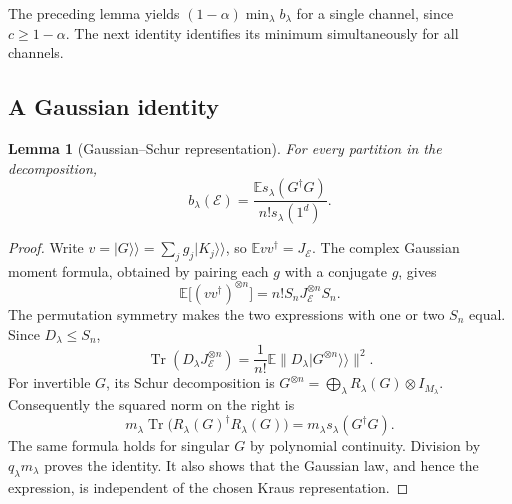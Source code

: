 \documentclass[11pt,a4paper]{article}
\newtheorem{lemma}[theorem]{Lemma}
\theoremstyle{remark}\newtheorem{remark}[theorem]{Remark}
\DeclareMathOperator{\Tr}{Tr}
\newcommand{\E}{\mathcal E}
\newcommand{\EE}{\mathbb E}
\newcommand{\vket}[1]{\lvert #1\rangle\!\rangle}
\begin{document}
The preceding lemma yields $(1-\alpha)\min_\lambda b_\lambda$ for a single channel, since $c\ge1-\alpha$. The next identity identifies its minimum simultaneously for all channels.

\subsection{A Gaussian identity}
\begin{lemma}[Gaussian--Schur representation]\label{lem:gauss}
For every partition in the decomposition,
\begin{equation}
b_\lambda(\E)=\frac{\EE s_\lambda(G^\dagger G)}{n!s_\lambda(1^d)}.
\label{eq:gauss}
\end{equation}
\end{lemma}
\begin{proof}
Write $v=\vket G=\sum_jg_j\vket{K_j}$, so $\EE vv^\dagger=J_\E$. The complex Gaussian moment formula, obtained by pairing each $g$ with a conjugate $g$, gives
\[
\EE\bigl[(vv^\dagger)^{\otimes n}\bigr]
=n!S_nJ_\E^{\otimes n}S_n.
\]
The permutation symmetry makes the two expressions with one or two $S_n$ equal. Since $D_\lambda\le S_n$,
\[
\Tr(D_\lambda J_\E^{\otimes n})
=\frac1{n!}\EE\|D_\lambda\vket{G^{\otimes n}}\|^2.
\]
For invertible $G$, its Schur decomposition is $G^{\otimes n}=\bigoplus_\lambda R_\lambda(G)\otimes I_{M_\lambda}$. Consequently the squared norm on the right is
\[
m_\lambda\Tr\bigl(R_\lambda(G)^\dagger R_\lambda(G)\bigr)
=m_\lambda s_\lambda(G^\dagger G).
\]
The same formula holds for singular $G$ by polynomial continuity. Division by $q_\lambda m_\lambda$ proves the identity. It also shows that the Gaussian law, and hence the expression, is independent of the chosen Kraus representation.
\end{proof}
\end{document}
